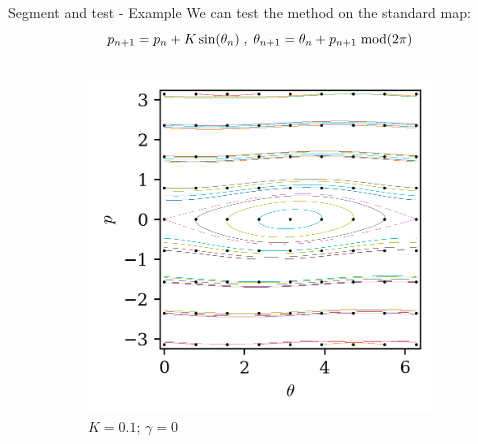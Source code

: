 \documentclass[10pt]{beamer}
\begin{document}
\begin{frame}{Segment and test - Example}
    We can test the method on the standard map:
    $$  p_{n+1} = p_n + K\sin(\theta_n) \hspace{0.1cm},\hspace{0.1cm} \theta_{n+1} = \theta_n + p_{n+1} \hspace{0.1cm} \textnormal{mod}(2\pi) $$
    
   \hline
    \begin{columns}[t]
        
        \begin{column}{0.5\textwidth}
        
        \begin{figure}
            \begin{subfigure}[t]{0.4\textwidth}
                \includegraphics[width=\textwidth]{std/map_1_0.1000.png}
                \caption*{$K = 0.1$; $\gamma = 0$}
            \end{subfigure}
            \begin{subfigure}[t]{0.4\textwidth}

\end{subfigure}
\end{figure}
\end{column}
\end{columns}
\end{frame}
\end{document}
